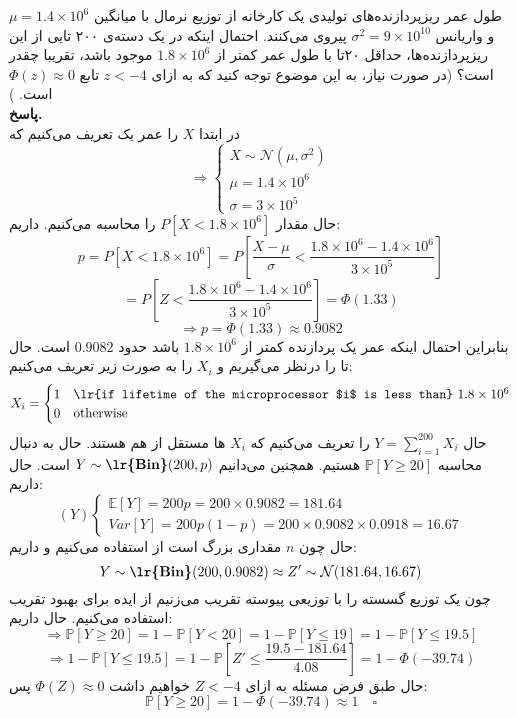 \problem{}
طول عمر ریزپردازنده‌های تولیدی یک کارخانه از توزیع نرمال با میانگین
$\mu = 1.4 \times 10^6$
و واریانس
$\sigma^2 = 9 \times 10^{10}$
پیروی می‌کنند. احتمال اینکه در یک دسته‌ی ۲۰۰ تایی از این ریزپردازنده‌ها، حداقل ۲۰تا با طول عمر کمتر از
$1.8 \times 10^6 $
موجود باشد، تقریبا چقدر است؟ (در صورت نیاز، به این موضوع توجه کنید که به ازای
$z < -4$
تابع 
$\Phi(z) \approx 0$
است. )
\\

\textbf{پاسخ.}\\

در ابتدا $X$ را عمر یک  تعریف می‌کنیم که 
\[
	\Longrightarrow\begin{cases}
		X \sim \mathcal{N}(\mu, \sigma^2) \\
		\mu = 1.4 \times 10^6 \\
		\sigma = 3\times 10^5
	\end{cases}
\]
حال مقدار $P[X < 1.8\times 10^6]$ را محاسبه می‌کنیم. داریم:
\[
	p=P[X < 1.8\times 10^6] = P[\frac{X-\mu}{\sigma} < \frac{1.8\times 10^6 - 1.4\times 10^6}{3\times 10^5}]
\]
\[
	= P[Z < \frac{1.8\times 10^6 - 1.4\times 10^6}{3\times 10^5}] = \Phi(1.33)
\]
\[
	\Longrightarrow p = \Phi(1.33) \approx 0.9082
\]
بنابراین احتمال اینکه عمر یک پردازنده کمتر از $1.8\times 10^6$ باشد حدود $0.9082$ است. 
حال  تا  را درنظر می‌گیریم و $X_i$ را به صورت زیر تعریف می‌کنیم:
\[
	X_i = \begin{cases}
		1 & \text{\lr{if lifetime of the microprocessor $i$ is less than}} \ 1.8 \times 10^6 \\
		0 & \text{otherwise}
	\end{cases}
\]
حال $Y = \sum_{i=1}^{200}X_i$ را تعریف می‌کنیم که $X_i$ ها مستقل از هم هستند. حال به دنبال محاسبه $\mathbb{P}[Y\geq 20]$ هستیم. همچنین می‌دانیم $Y\sim \textbf{\lr{Bin}}(200,p)$ است. حال داریم:
\[
	(Y)\begin{cases}
		\mathbb{E}[Y] = 200p = 200\times 0.9082 = 181.64 \\
		Var[Y] = 200p(1-p) = 200\times 0.9082 \times 0.0918 = 16.67
	\end{cases}
\]
حال چون $n$ مقداری بزرگ است از  استفاده می‌کنیم و داریم:
\[
	Y\sim \textbf{\lr{Bin}}(200,0.9082) \approx Z'\sim \mathcal{N}(181.64, 16.67)
\]
چون یک توزیع گسسته را با توزیعی پیوسته تقریب می‌زنیم از ایده  برای بهبود تقریب استفاده می‌کنیم. حال داریم:
\[
	\Longrightarrow \mathbb{P}[Y\geq 20] = 1-\mathbb{P}[Y<20] = 1-\mathbb{P}[Y\leq 19] = 1-\mathbb{P}[Y\leq 19.5]
\]
\[
	\Longrightarrow 1-\mathbb{P}[Y\leq 19.5] = 1-\mathbb{P}[Z'\leq \frac{19.5-181.64}{4.08}] = 1-\Phi(-39.74)  
\]
حال طبق فرض مسئله به ازای $Z<-4$ خواهیم داشت $\Phi(Z)\approx 0$ پس:
\[
	\mathbb{P}[Y\geq 20] = 1-\Phi(-39.74) \approx 1 \quad \square
\]